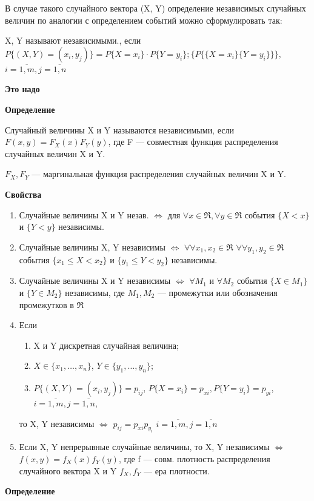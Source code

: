 В случае такого случайного вектора (X, Y) определение независимых случайных величин по аналогии с определением событий можно сформулировать так:

X, Y называют независимыми., если $P\{(X, Y)=(x_i, y_j)\} = P\{X=x_i\} \cdot P\{Y=y_i\}; \{P\{\{X=x_i\}\{Y=y_i\}\}\},$ $i=\overline{1,m}, j=\overline{1,n}$ 

\textbf{Это надо}

\textbf{Определение}

Случайный величины X и Y называются независимыми, если $F(x, y) = F_X(x)F_Y(y)$, где F --- совместная функция распределения случайных величин X и Y.

$F_X, F_Y$ --- маргинальная функция распределения случайных величин X и Y.

\textbf{Свойства}

\begin{enumerate}[label=\arabic*.]
	\item Случайные величины X и Y незав. $\Leftrightarrow$ для $\forall x \in \Re, \forall y \in \Re$ события $\{X<x\}$ и $\{Y < y\}$ независимы.
	\item Случайные величины X, Y независимы $\Leftrightarrow$ $\forall \forall x_1, x_2 \in \Re$ $\forall \forall y_1, y_2 \in \Re$ события $\{x_1 \leq X < x_2\}$ и $\{y_1 \leq Y < y_2\}$ независимы.
	\item Случайные величины X и Y независимы $\Leftrightarrow$ $\forall M_1$ и $\forall M_2$ события $\{X \in M_1\}$ и $\{Y \in M_2\}$ независимы, где $M_1, M_2$ --- промежутки или обозначения промежутков в $\Re$
	\item Если \begin{enumerate}[label=\arabic*]
		\item X и Y дискретная случайная величина;
		\item $X \in \{x_1, \dots, x_n\}$, $Y \in \{y_1, \dots, y_n\}$;
		\item $P\{(X, Y)=(x_i, y_j)\} = p_{ij}$, $P\{X=x_i\}=p_{xi}, P\{Y=y_i\}=p_{yi}$, $i=\overline{1,m}, j=\overline{1,n}$,
	\end{enumerate}
	то X, Y независимы $\Leftrightarrow$ $p_{ij} = p_{xi}p_{y_i}$ $i=\overline{1,m}, j=\overline{1,n}$
	\item Если X, Y непрерывные случайные величины, то X, Y независимы $\Leftrightarrow$ $f(x, y) = f_X(x)f_Y(y)$, где f --- совм. плотность распределения случайного вектора X и Y $f_X, f_Y$ --- ера плотности.
\end{enumerate}

\textbf{Определение}

